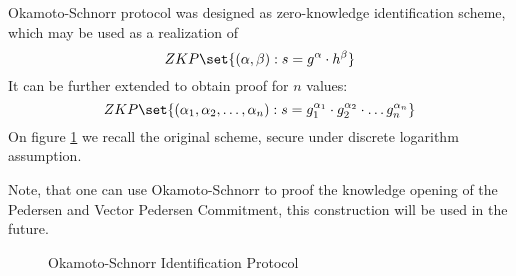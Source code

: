 \begin{definition}
Okamoto-Schnorr protocol \cite{Schnorr1991, okamoto} was designed as zero-knowledge identification scheme, which may be used as a realization of 
$$ ZKP\set{(\alpha, \beta): s = g^\alpha \cdot h^\beta} $$
It can be further extended to obtain proof for $n$ values:
$$ ZKP\set{(\alpha_1, \alpha_2, \dots, \alpha_n): s = g_1^{\alpha_1} \cdot g_2^{\alpha_2} \cdot \dots g_n^{\alpha_n}} $$
On figure \ref{fig:schnorr} we recall the original scheme, secure under discrete logarithm assumption.
\end{definition}
Note, that one can use Okamoto-Schnorr to proof the knowledge opening of the Pedersen and Vector Pedersen Commitment, this construction will be used in the future. 

\begin{figure}[h]
\centering

\begin{pcvstack}

\begin{pchstack}[center]

\pchspace


\end{pchstack}

\pcvspace

\end{pcvstack}

\caption{Okamoto-Schnorr Identification Protocol}
\label{fig:schnorr}
\end{figure}

